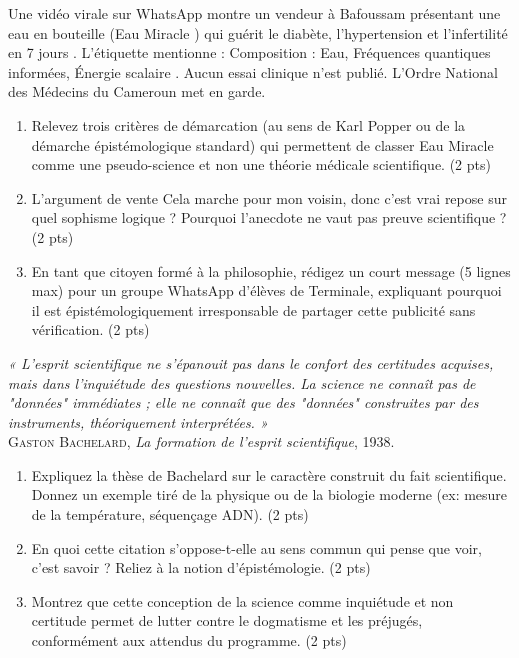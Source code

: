 \documentclass[11pt]{article}
\begin{document}
\begin{exercice}
Une vidéo virale sur WhatsApp montre un vendeur à Bafoussam présentant une eau en bouteille (\og Eau Miracle \fg{}) qui \og guérit le diabète, l'hypertension et l'infertilité en 7 jours \fg{}. L'étiquette mentionne : \og Composition : Eau, Fréquences quantiques informées, Énergie scalaire \fg{}. Aucun essai clinique n'est publié. L'Ordre National des Médecins du Cameroun met en garde.

\begin{enumerate}
    \item Relevez trois critères de démarcation (au sens de Karl Popper ou de la démarche épistémologique standard) qui permettent de classer \og Eau Miracle \fg{} comme une pseudo-science et non une théorie médicale scientifique. (2 pts)
    \item L'argument de vente \og Cela marche pour mon voisin, donc c'est vrai \fg{} repose sur quel sophisme logique ? Pourquoi l'anecdote ne vaut pas preuve scientifique ? (2 pts)
    \item En tant que citoyen formé à la philosophie, rédigez un court message (5 lignes max) pour un groupe WhatsApp d'élèves de Terminale, expliquant pourquoi il est épistémologiquement irresponsable de partager cette publicité sans vérification. (2 pts)
\end{enumerate}
\end{exercice}

\begin{exercice}
\noindent \textit{« L'esprit scientifique ne s'épanouit pas dans le confort des certitudes acquises, mais dans l'inquiétude des questions nouvelles. La science ne connaît pas de "données" immédiates ; elle ne connaît que des "données" construites par des instruments, théoriquement interprétées. »} \\
\noindent \textsc{Gaston Bachelard}, \textit{La formation de l'esprit scientifique}, 1938.

\begin{enumerate}
    \item Expliquez la thèse de Bachelard sur le caractère \og construit \fg{} du fait scientifique. Donnez un exemple tiré de la physique ou de la biologie moderne (ex: mesure de la température, séquençage ADN). (2 pts)
    \item En quoi cette citation s'oppose-t-elle au sens commun qui pense que \og voir, c'est savoir \fg{} ? Reliez à la notion d'épistémologie. (2 pts)
    \item Montrez que cette conception de la science comme \og inquiétude \fg{} et non \og certitude \fg{} permet de lutter contre le dogmatisme et les préjugés, conformément aux attendus du programme. (2 pts)
\end{enumerate}
\end{exercice}
\end{document}
